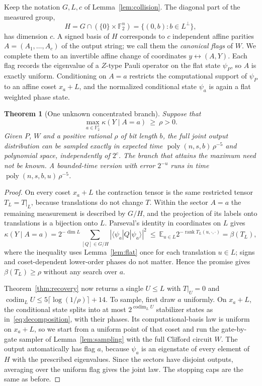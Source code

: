 \documentclass[a4paper,onecolumn,11pt,unpublished]{quantumarticle}
\theoremstyle{plain}
\newtheorem{theorem}{Theorem}
\theoremstyle{remark}
\newcommand{\F}{\mathbb{F}_2}
\newcommand{\ket}[1]{|#1\rangle}
\newcommand{\bra}[1]{\langle #1|}
\DeclareMathOperator{\rank}{rank}
\DeclareMathOperator{\codim}{codim}
\DeclareMathOperator{\poly}{poly}
\newcommand{\E}{\mathbb{E}}
\begin{document}
Keep the notation $G,L,c$ of Lemma~\ref{lem:collision}. The diagonal part of the measured group,
\[
H=G\cap(\{0\}\times\F^n)=\{(0,b):b\in L^\perp\},
\]
has dimension $c$. A signed basis of $H$ corresponds to $c$ independent affine parities $A=(A_1,\dots,A_c)$ of the output string; we call them the \emph{canonical flags} of $W$. We complete them to an invertible affine change of coordinates $y\leftrightarrow(A,Y)$. Each flag records the eigenvalue of a $Z$-type Pauli operator on the flat state $\psi_P$, so $A$ is exactly uniform. Conditioning on $A=a$ restricts the computational support of $\psi_P$ to an affine coset $x_a+L$, and the normalized conditional state $\psi_a$ is again a flat weighted phase state.

\begin{theorem}[One unknown concentrated branch]\label{thm:flag}
Suppose that
\[
\max_{a\in\F^c}\kappa(Y\mid A=a)\ \ge\ \rho>0 .
\]
Given $P$, $W$ and a positive rational $\rho$ of bit length $b$, the full joint output distribution can be sampled exactly in expected time $\poly(n,s,b)\,\rho^{-5}$ and polynomial space, independently of $2^c$. The branch that attains the maximum need not be known. A bounded-time version with error $2^{-u}$ runs in time $\poly(n,s,b,u)\,\rho^{-5}$.
\end{theorem}

\begin{proof}
On every coset $x_a+L$ the contraction tensor is the same restricted tensor $T_L=T|_L$, because translations do not change $T$. Within the sector $A=a$ the remaining measurement is described by $G/H$, and the projection of its labels onto translations is a bijection onto $L$. Parseval's identity in coordinates on $L$ gives
\[
\kappa(Y\mid A=a)=2^{-\dim L}\sum_{[Q]\in G/H}|\bra{\psi_a}Q\ket{\psi_a}|^2\ \le\ \E_{u\in L}2^{-\rank T_L(u,\cdot,\cdot)}=\beta(T_L),
\]
where the inequality uses Lemma~\ref{lem:flat} once for each translation $u\in L$; signs and coset-dependent lower-order phases do not matter. Hence the promise gives $\beta(T_L)\ge\rho$ without any search over $a$.

Theorem~\ref{thm:recovery} now returns a single $U\le L$ with $T|_U=0$ and $\codim_LU\le5\lceil\log(1/\rho)\rceil+14$. To sample, first draw $a$ uniformly. On $x_a+L$, the conditional state splits into at most $2^{\codim_LU}$ stabilizer states as in~\eqref{eq:decomposition}, with their phases. Its computational-basis law is uniform on $x_a+L$, so we start from a uniform point of that coset and run the gate-by-gate sampler of Lemma~\ref{lem:sampling} with the full Clifford circuit $W$. The output automatically has flag $a$, because $\psi_a$ is an eigenstate of every element of $H$ with the prescribed eigenvalues. Since the sectors have disjoint outputs, averaging over the uniform flag gives the joint law. The stopping caps are the same as before.
\end{proof}
\end{document}
